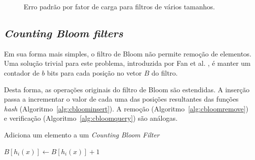 \begin{figure}[!htbp]
\centering
{}
\caption{Erro padrão por fator de carga para filtros de vários tamanhos.}
\label{fig:bloom_cardinality}
\end{figure}

\subsection{\emph{Counting Bloom filters}}\label{sec:bloom:counting}

Em sua forma mais simples, o filtro de Bloom não permite remoção de elementos. Uma solução trivial para este problema, introduzida por Fan et al. \cite{fan1998summary}, é manter um contador de $b$ bits para cada posição no vetor $B$ do filtro.

Desta forma, as operações originais do filtro de Bloom são estendidas. A inserção passa a incrementar o valor de cada uma das posições resultantes das funções \emph{hash} (Algoritmo~\ref{alg:cbloominsert}). A remoção (Algoritmo~\ref{alg:cbloomremove}) e verificação (Algoritmo~\ref{alg:cbloomquery}) são análogas.


\begin{algorithm}[!htbp]
\linespread{1}\selectfont
\caption{Adiciona um elemento a um \emph{Counting Bloom Filter}}
\label{alg:cbloominsert}
\begin{algorithmic}[1]
            \State $B[h_i(x)] \gets B[h_i(x)]+1$
        \EndIf
	\EndFor
\EndProcedure
\end{algorithmic}
\end{algorithm}


